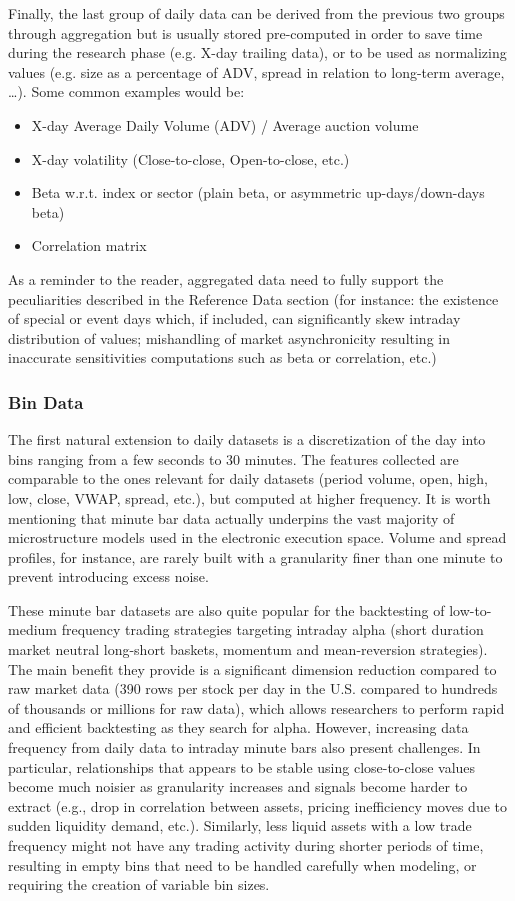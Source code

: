 Finally, the last group of daily data can be derived from the previous two groups through aggregation but is usually stored pre-computed in order to save time during the research phase (e.g. X-day trailing data), or to be used as normalizing values (e.g. size as a percentage of ADV, spread in relation to long-term average, \dots). Some common examples would be:
        \begin{itemize}
        \item X-day Average Daily Volume (ADV) / Average auction volume
        \item X-day volatility (Close-to-close, Open-to-close, etc.)
        \item Beta w.r.t. index or sector (plain beta, or asymmetric up-days/down-days beta)
        \item Correlation matrix
        \end{itemize}
As a reminder to the reader, aggregated data need to fully support the peculiarities described in the Reference Data section (for instance: the existence of special or event days which, if included, can significantly skew intraday distribution of values; mishandling of market asynchronicity resulting in inaccurate sensitivities computations such as beta or correlation, etc.)


\subsubsection{Bin Data}


The first natural extension to daily datasets is a discretization of the day into bins ranging from a few seconds to 30 minutes. The features collected are comparable to the ones relevant for daily datasets (period volume, open, high, low, close, VWAP, spread, etc.), but computed at higher frequency. It is worth mentioning that minute bar data actually underpins the vast majority of microstructure models used in the electronic execution space. Volume and spread profiles, for instance, are rarely built with a granularity finer than one minute to prevent introducing excess noise.

These minute bar datasets are also quite popular for the backtesting of low-to-medium frequency trading strategies targeting intraday alpha (short duration market neutral long-short baskets, momentum and mean-reversion strategies). The main benefit they provide is a significant dimension reduction compared to raw market data (390 rows per stock per day in the U.S. compared to hundreds of thousands or millions for raw data), which allows researchers to perform rapid and efficient backtesting as they search for alpha. However, increasing data frequency from daily data to intraday minute bars also present challenges. In particular, relationships that appears to be stable using close-to-close values become much noisier as granularity increases and signals become harder to extract (e.g., drop in correlation between assets, pricing inefficiency moves due to sudden liquidity demand, etc.). Similarly, less liquid assets with a low trade frequency might not have any trading activity during shorter periods of time, resulting in empty bins that need to be handled carefully when modeling, or requiring the creation of variable bin sizes.


